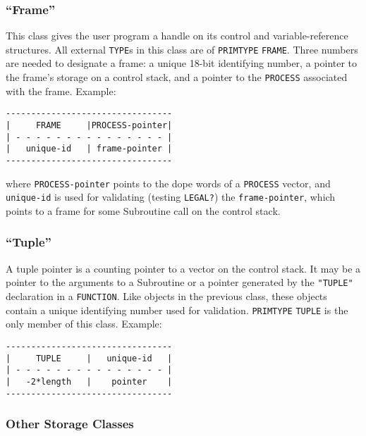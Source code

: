 \documentclass[a4paper]{scrbook}
\begin{document}
\subsubsection*{\texorpdfstring{``Frame''}{Frame}}\label{frame}

This class gives the user program a handle on its control and variable-reference structures. All external \texttt{TYPE}s in
this class are of \texttt{PRIMTYPE} \texttt{FRAME}. Three numbers are needed to designate a frame: a unique 18-bit
identifying number, a pointer to the frame's storage on a control stack, and a pointer to the
\texttt{PROCESS} associated with the frame. Example:

\begin{verbatim}
---------------------------------
|     FRAME     |PROCESS-pointer|
| - - - - - - - - - - - - - - - |
|   unique-id   | frame-pointer |
---------------------------------
\end{verbatim}

where \texttt{PROCESS-pointer} points to the dope words of a \texttt{PROCESS} vector, and \texttt{unique-id} is used for
validating (testing \texttt{LEGAL?}) the \texttt{frame-pointer}, which points to a frame for some
Subroutine call on the control stack.

\subsubsection*{\texorpdfstring{``Tuple''}{Tuple}}\label{tuple}

A tuple pointer is a counting pointer to a vector on the control stack. It may be a pointer to the arguments to a
Subroutine or a pointer generated by the \texttt{"TUPLE"} declaration in a \texttt{FUNCTION}. Like objects in the previous
class, these objects contain a unique identifying number used for validation. \texttt{PRIMTYPE} \texttt{TUPLE} is the only
member of this class. Example:

\begin{verbatim}
---------------------------------
|     TUPLE     |   unique-id   |
| - - - - - - - - - - - - - - - |
|   -2*length   |    pointer    |
---------------------------------
\end{verbatim}

\subsubsection*{Other Storage Classes}\label{other-storage-classes}
\end{document}
